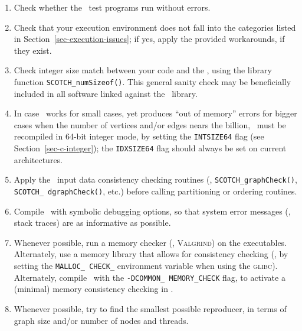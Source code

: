 \begin{enumerate}
\item
Check whether the \scotch\ test programs run without errors.
\item
Check that your execution environment does not fall into the
categories listed in Section~\ref{sec-execution-issues}; if yes, apply
the provided workarounds, if they exist.
\item
Check integer size match between your code and the \libscotch, using
the library function \texttt{SCOTCH\_\lbt numSizeof()}. This general
sanity check may be beneficially included in all software linked
against the \libscotch\ library.
\item
In case \scotch\ works for small cases, yet produces ``out of memory''
errors for bigger cases when the number of vertices and/or edges
nears the billion, \scotch\ must be recompiled in 64-bit integer mode,
by setting the \texttt{INTSIZE64} flag (see
Section~\ref{sec-c-integer}); the \texttt{IDXSIZE64} flag should
always be set on current architectures.
\item
Apply the \scotch\ input data consistency checking routines (\eg,
\texttt{SCOTCH\_\lbt graph\lbt Check()}, \texttt{SCOTCH\_\lbt
dgraph\lbt Check()}, etc.) before calling partitioning or ordering
routines.
\item
Compile \scotch\ with symbolic debugging options, so that system error
messages (\eg, stack traces) are as informative as possible.
\item
Whenever possible, run a memory checker (\eg, \textsc{Valgrind}) on
the executables. Alternately, use a memory library that allows for
consistency checking (\eg, by setting the \texttt{MALLOC\_\lbt
CHECK\_} environment variable when using the \textsc{glibc}).
Alternately, compile \scotch\ with the \texttt{-DCOMMON\_\lbt
MEMORY\_\lbt CHECK} flag, to activate a (minimal) memory consistency
checking in \scotch.
\item
Whenever possible, try to find the smallest possible reproducer, in
terms of graph size and/or number of nodes and threads.
\end{enumerate}

\begin{center}
\end{center}

